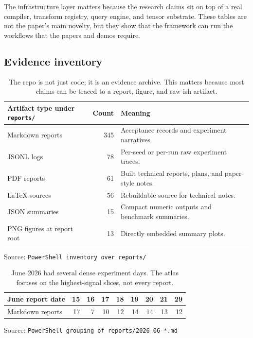 \documentclass[10pt]{article}
\newcommand{\src}[1]{\par\footnotesize\textcolor{gray!70!black}{Source: \nolinkurl{#1}}\normalsize}
\begin{document}
The infrastructure layer matters because the research claims sit on top of a
real compiler, transform registry, query engine, and tensor substrate. These
tables are not the paper's main novelty, but they show that the framework can
run the workflows that the papers and demos require.

\subsection{Evidence inventory}

\begin{table}[!htbp]\centering\small
\begin{tabular}{lrl}
\toprule
Artifact type under \nolinkurl{reports/} & Count & Meaning \\
\midrule
Markdown reports & 345 & Acceptance records and experiment narratives. \\
JSONL logs & 78 & Per-seed or per-run raw experiment traces. \\
PDF reports & 61 & Built technical reports, plans, and paper-style notes. \\
LaTeX sources & 56 & Rebuildable source for technical notes. \\
JSON summaries & 15 & Compact numeric outputs and benchmark summaries. \\
PNG figures at report root & 13 & Directly embedded summary plots. \\
\bottomrule
\end{tabular}
\caption{The repo is not just code; it is an evidence archive. This matters
because most claims can be traced to a report, figure, and raw-ish artifact.}
\src{PowerShell inventory over reports/}
\end{table}

\begin{table}[!htbp]\centering\small
\begin{tabular}{lrrrrrrrr}
\toprule
June report date & 15 & 16 & 17 & 18 & 19 & 20 & 21 & 29 \\
\midrule
Markdown reports & 17 & 7 & 10 & 12 & 14 & 14 & 13 & 12 \\
\bottomrule
\end{tabular}
\caption{June 2026 had several dense experiment days. The atlas focuses on the
highest-signal slices, not every report.}
\src{PowerShell grouping of reports/2026-06-*.md}
\end{table}
\end{document}
